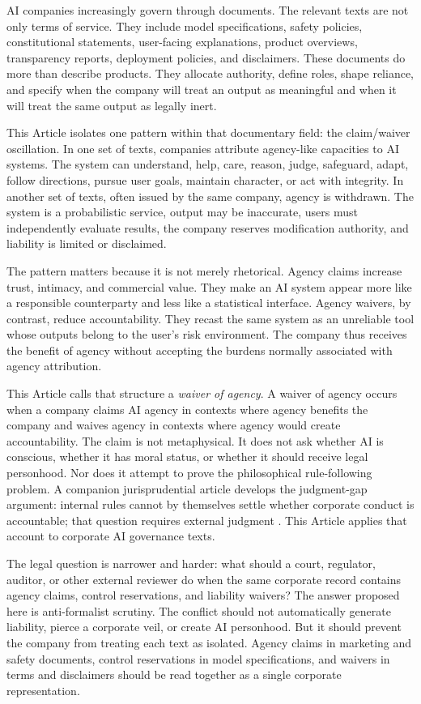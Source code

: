\documentclass[11pt,a4paper]{article}
\begin{document}
AI companies increasingly govern through documents. The relevant texts are not only terms of service. They include model specifications, safety policies, constitutional statements, user-facing explanations, product overviews, transparency reports, deployment policies, and disclaimers. These documents do more than describe products. They allocate authority, define roles, shape reliance, and specify when the company will treat an output as meaningful and when it will treat the same output as legally inert.

This Article isolates one pattern within that documentary field: the claim/waiver oscillation. In one set of texts, companies attribute agency-like capacities to AI systems. The system can understand, help, care, reason, judge, safeguard, adapt, follow directions, pursue user goals, maintain character, or act with integrity. In another set of texts, often issued by the same company, agency is withdrawn. The system is a probabilistic service, output may be inaccurate, users must independently evaluate results, the company reserves modification authority, and liability is limited or disclaimed.

The pattern matters because it is not merely rhetorical. Agency claims increase trust, intimacy, and commercial value. They make an AI system appear more like a responsible counterparty and less like a statistical interface. Agency waivers, by contrast, reduce accountability. They recast the same system as an unreliable tool whose outputs belong to the user's risk environment. The company thus receives the benefit of agency without accepting the burdens normally associated with agency attribution.

This Article calls that structure a \emph{waiver of agency}. A waiver of agency occurs when a company claims AI agency in contexts where agency benefits the company and waives agency in contexts where agency would create accountability. The claim is not metaphysical. It does not ask whether AI is conscious, whether it has moral status, or whether it should receive legal personhood. Nor does it attempt to prove the philosophical rule-following problem. A companion jurisprudential article develops the judgment-gap argument: internal rules cannot by themselves settle whether corporate conduct is accountable; that question requires external judgment \citep{author2026ruleswithoutjudgment}. This Article applies that account to corporate AI governance texts.

The legal question is narrower and harder: what should a court, regulator, auditor, or other external reviewer do when the same corporate record contains agency claims, control reservations, and liability waivers? The answer proposed here is anti-formalist scrutiny. The conflict should not automatically generate liability, pierce a corporate veil, or create AI personhood. But it should prevent the company from treating each text as isolated. Agency claims in marketing and safety documents, control reservations in model specifications, and waivers in terms and disclaimers should be read together as a single corporate representation.
\end{document}
